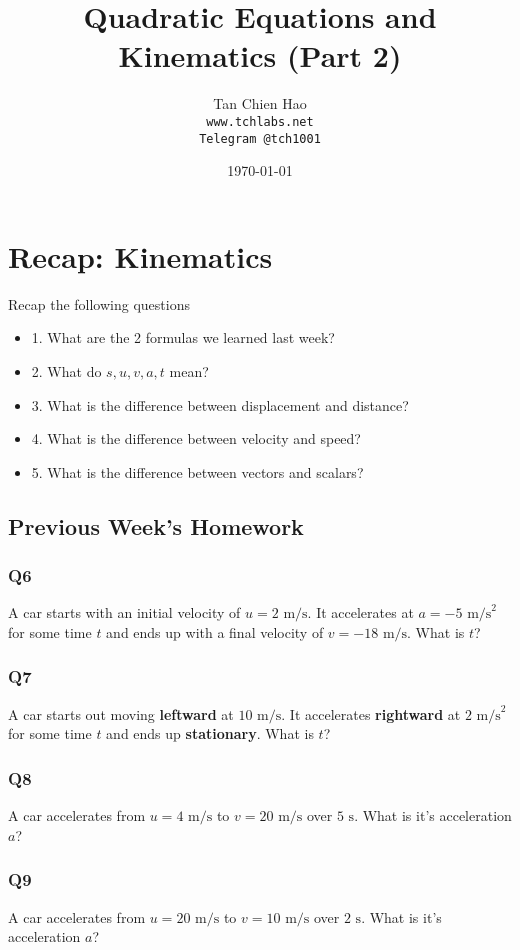\documentclass{article}
\title{Quadratic Equations and Kinematics (Part 2)}
\author{
    Tan Chien Hao\\
    \texttt{www.tchlabs.net}\\
    \texttt{Telegram @tch1001}
}
\date{\today}
\begin{document}
\newif\ifpaper

\paperfalse 

\maketitle
\section{Recap: Kinematics}
Recap the following questions
\begin{itemize}
\item[] 1. What are the 2 formulas we learned last week? 
\item[] 2. What do $s,u,v,a,t$ mean? 
\item[] 3. What is the difference between displacement and distance?
\item[] 4. What is the difference between velocity and speed?
\item[] 5. What is the difference between vectors and scalars? 
\end{itemize}
\clearpage

\subsection{Previous Week's Homework}
\subsubsection{Q6}
A car starts with an initial velocity of $u=2 \text{ m/s}$. It accelerates at $a=-5\text{ m/s}^2$ for some time $t$ and ends up with a final velocity of $v=-18 \text{ m/s}$. What is $t$? \\[50pt]
\subsubsection{Q7}
A car starts out moving \textbf{leftward} at $10 \text{ m/s}$. It accelerates \textbf{rightward} at $2\text{ m/s}^2$ for some time $t$ and ends up \textbf{stationary}. What is $t$? \\[50pt]
\subsubsection{Q8}
A car accelerates from $u=4\text{ m/s}$ to $v=20\text{ m/s}$ over $5\text{ s}$. What is it's acceleration $a$? \\[50pt]
\subsubsection{Q9}
A car accelerates from $u=20\text{ m/s}$ to $v=10\text{ m/s}$ over $2\text{ s}$. What is it's acceleration $a$? \\[50pt]
\end{document}
